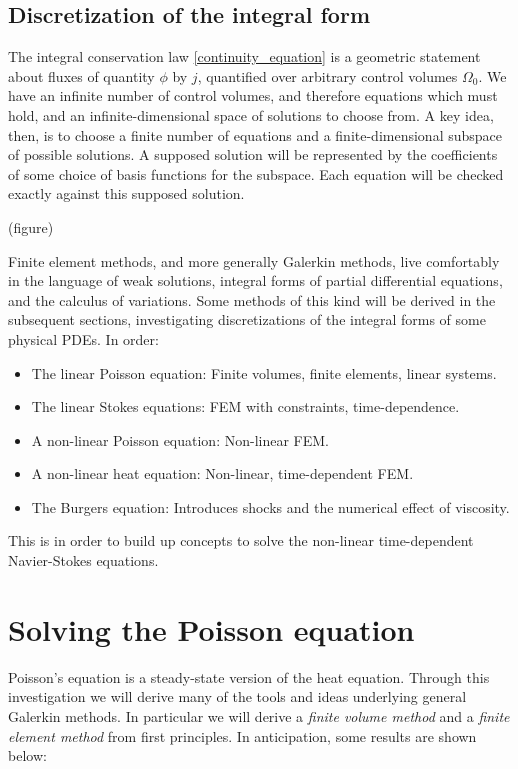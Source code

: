 \subsection{Discretization of the integral form}
The integral conservation law \eqref{continuity_equation} is a geometric statement about fluxes
of quantity $\phi$ by $j$, quantified over arbitrary control volumes $\Omega_0$.
We have an infinite number of control volumes, and therefore equations which must hold, and an infinite-dimensional
space of solutions to choose from. A key idea, then, is to choose a finite number of equations and a finite-dimensional subspace of possible solutions.
A supposed solution will be represented by the coefficients of some choice of basis functions for the subspace. Each equation will be checked exactly against this supposed solution.

\vskip 0.2in
(figure)
\vskip 0.2in

Finite element methods, and more generally Galerkin methods, live comfortably in the language of weak solutions, integral forms of partial differential equations,
and the calculus of variations. Some methods of this kind will be derived in the subsequent sections, investigating discretizations of the integral forms
of some physical PDEs. In order:
\begin{itemize}
    \item The linear Poisson equation: Finite volumes, finite elements, linear systems.
    \item The linear Stokes equations: FEM with constraints, time-dependence.
    \item A non-linear Poisson equation: Non-linear FEM.
    \item A non-linear heat equation: Non-linear, time-dependent FEM.
    \item The Burgers equation: Introduces shocks and the numerical effect of viscosity.
\end{itemize}
This is in order to build up concepts to solve the non-linear time-dependent Navier-Stokes equations.

\section{Solving the Poisson equation}
Poisson's equation is a steady-state version of the heat equation.
Through this investigation we will derive many of the tools and ideas underlying general Galerkin methods.
In particular we will derive a \textit{finite volume method} and a \textit{finite element method} from first principles.
In anticipation, some results are shown below:

